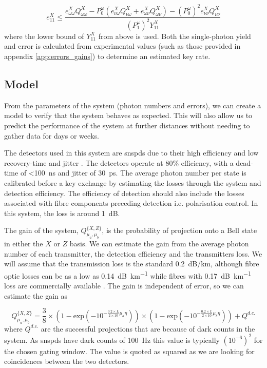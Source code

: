 \begin{equation}
	e^X_{11} \le \frac{e^X_{\omega\omega}Q^X_{\omega\omega} - P^\omega_0\left(e^X_{\nu\omega}Q^X_{\nu\omega} + e^X_{\omega\nu}Q^X_{\omega\nu}\right) - (P^\omega_0)^2e^X_{\nu\nu}Q^X_{\nu\nu}}{(P^\omega_1)^2 Y^X_{11}}
\end{equation}
where the lower bound of $Y^X_{11}$ from above is used. Both the single-photon yield and error is calculated from experimental values (such as those provided in appendix \ref{app:errors_gains}) to determine an estimated key rate.



\subsection{Model}
\label{sec:mdi_model}

From the parameters of the system (photon numbers and errors), we can create a model to verify that the system behaves as expected. This will also allow us to predict the performance of the system at further distances without needing to gather data for days or weeks. 

The detectors used in this system are \acp{snspd} due to their high efficiency and low recovery-time and jitter \cite{sprengers2011}. The detectors operate at $80\%$ efficiency, with a dead-time of \SI{<100}{ns} and jitter of \SI{30}{ps}. The average photon number per state is calibrated before a key exchange by estimating the losses through the system and detection efficiency. The efficiency of detection should also include the losses associated with fibre components preceding detection i.e. polarisation control. In this system, the loss is around \SI{1}{dB}.

The gain of the system, $Q^{ \{X,Z\} }_{\mu_a,\mu_b}$, is the probability of projection onto a Bell state in either the $X$ or $Z$ basis. We can estimate the gain from the average photon number of each transmitter, the detection efficiency and the transmitters loss. We will assume that the transmission loss is the standard \SI{0.2}{dB/km}, although fibre optic losses can be as a low as \SI{0.14}{dB\per\km} \cite{tamura2018} while fibres with \SI{0.17}{dB\per\km} loss are commercially available \cite{corningULL}. The gain is independent of error, so we can estimate the gain as 

\begin{equation}
	Q^{ \{X,Z\} }_{\mu_a,\mu_b} = \frac{3}{8} \times \left( 1 - \text{exp} \left( -10^{- \frac{0.2 \times L}{2 \times 10} \mu_a \eta}  \right)  \right) \times \left( 1 - \text{exp} \left( -10^{- \frac{0.2 \times L}{2 \times 10} \mu_b \eta}  \right)  \right) + Q^{d.c.}
\end{equation}
where $Q^{d.c.}$ are the successful projections that are because of dark counts in the system. As \acp{snspd} have dark counts of \SI{100}{Hz} this value is typically $\left(10^{-6}\right)^2$ for the chosen gating window. The value is quoted as squared as we are looking for coincidences between the two detectors. 

